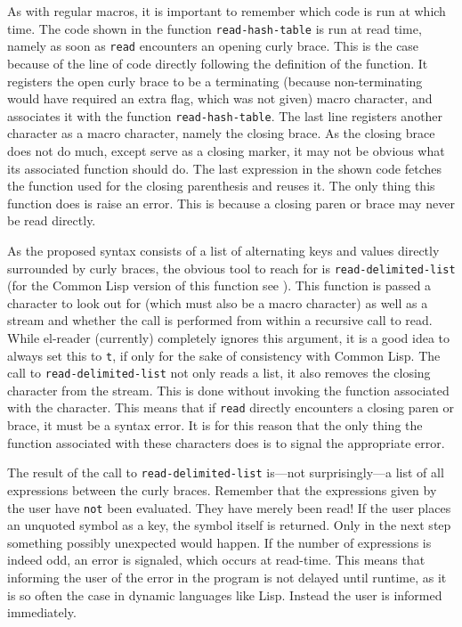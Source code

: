 \documentclass[a4paper,10pt,twoside]{report}
\newcommand{\cl}{Common Lisp}
\newcommand{\elr}{el-reader}
\newcommand{\sym}[1]{\texttt{#1}}
\newcommand{\fun}[1]{\texttt{#1}}
\newcommand{\Read}{\fun{read}}
\newcommand{\tee}{\sym{t}}
\begin{document}
As with regular macros, it is important to remember which code is run at which
time.  The code shown in the function \fun{read-hash-table} is run at read time,
namely as soon as \Read{} encounters an opening curly brace.  This is the case
because of the line of code directly following the definition of the function.
It registers the open curly brace to be a terminating (because non-terminating
would have required an extra flag, which was not given) macro character, and
associates it with the function \fun{read-hash-table}.  The last line registers
another character as a macro character, namely the closing brace.  As the
closing brace does not do much, except serve as a closing marker, it may not be
obvious what its associated function should do.  The last expression in the
shown code fetches the function used for the closing parenthesis and reuses it.
The only thing this function does is raise an error.  This is because a closing
paren or brace may never be read directly.

As the proposed syntax consists of a list of alternating keys and values
directly surrounded by curly braces, the obvious tool to reach for is
\fun{read-delimited-list} (for the \cl{} version of this function see
\cite[Section 23.2 ``The Reader Dictionary'']{hyperspec}).  This function is
passed a character to look out for (which must also be a macro character) as
well as a stream and whether the call is performed from within a recursive call
to read.  While \elr{} (currently) completely ignores this argument, it is a
good idea to always set this to \tee{}, if only for the sake of consistency with
\cl{}.  The call to \fun{read-delimited-list} not only reads a list, it also
removes the closing character from the stream.  This is done without invoking
the function associated with the character.  This means that if \Read{} directly
encounters a closing paren or brace, it must be a syntax error.  It is for this
reason that the only thing the function associated with these characters does is
to signal the appropriate error.

The result of the call to \fun{read-delimited-list} is---not surprisingly---a
list of all expressions between the curly braces.  Remember that the expressions
given by the user have \texttt{not} been evaluated.  They have merely been read!
If the user places an unquoted symbol as a key, the symbol itself is returned.
Only in the next step something possibly unexpected would happen.  If the number
of expressions is indeed odd, an error is signaled, which occurs at read-time.
This means that informing the user of the error in the program is not delayed
until runtime, as it is so often the case in dynamic languages like Lisp.
Instead the user is informed immediately.
\end{document}
